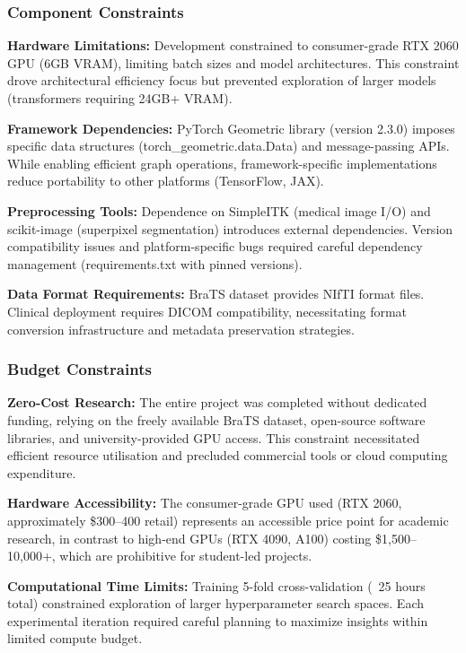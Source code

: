 \subsubsection{Component Constraints}

\textbf{Hardware Limitations:} Development constrained to consumer-grade RTX 2060 GPU (6GB VRAM), limiting batch sizes and model architectures. This constraint drove architectural efficiency focus but prevented exploration of larger models (transformers requiring 24GB+ VRAM).

\textbf{Framework Dependencies:} PyTorch Geometric library (version 2.3.0) imposes specific data structures (torch\_geometric.data.Data) and message-passing APIs. While enabling efficient graph operations, framework-specific implementations reduce portability to other platforms (TensorFlow, JAX).

\textbf{Preprocessing Tools:} Dependence on SimpleITK (medical image I/O) and scikit-image (superpixel segmentation) introduces external dependencies. Version compatibility issues and platform-specific bugs required careful dependency management (requirements.txt with pinned versions).

\textbf{Data Format Requirements:} BraTS dataset provides NIfTI format files. Clinical deployment requires DICOM compatibility, necessitating format conversion infrastructure and metadata preservation strategies.

\subsubsection{Budget Constraints}

\textbf{Zero-Cost Research:} The entire project was completed without dedicated funding, relying on the freely available BraTS dataset, open-source software libraries, and university-provided GPU access. This constraint necessitated efficient resource utilisation and precluded commercial tools or cloud computing expenditure.

\textbf{Hardware Accessibility:} The consumer-grade GPU used (RTX 2060, approximately \$300--400 retail) represents an accessible price point for academic research, in contrast to high-end GPUs (RTX 4090, A100) costing \$1,500--10,000+, which are prohibitive for student-led projects.

\textbf{Computational Time Limits:} Training 5-fold cross-validation (~25 hours total) constrained exploration of larger hyperparameter search spaces. Each experimental iteration required careful planning to maximize insights within limited compute budget.

